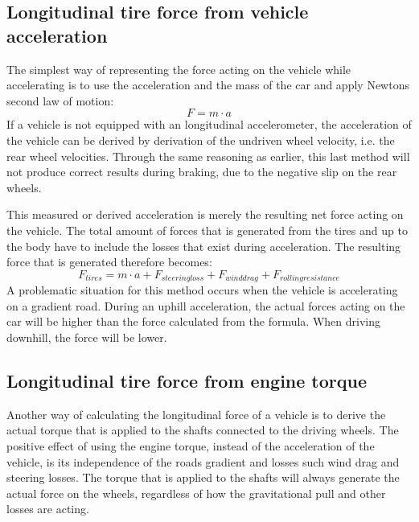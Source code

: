 \subsection{Longitudinal tire force from vehicle acceleration}

The simplest way of representing the force acting on the vehicle while accelerating is to use the acceleration and the mass of the car and apply Newtons second law of motion:
\begin{equation}
	F = m \cdot a
\end{equation}
If a vehicle is not equipped with an longitudinal accelerometer, the acceleration of the vehicle can be derived by derivation of the undriven wheel velocity, i.e. the rear wheel velocities. Through the same reasoning as earlier, this last method will not produce correct results during braking, due to the negative slip on the rear wheels. 

This measured or derived acceleration is merely the resulting net force acting on the vehicle. The total amount of forces that is generated from the tires and up to the body have to include the losses that exist during acceleration. The resulting force that is generated therefore becomes: 
\begin{equation}
F_{tires} = m \cdot a + F_{steering loss} + F_{wind drag} + F_{rolling resistance}
\end{equation}
A problematic situation for this method occurs when the vehicle is accelerating on a gradient road. During an uphill acceleration, the actual forces acting on the car will be higher than the force calculated from the formula. When driving downhill, the force will be lower. 

\subsection{Longitudinal tire force from engine torque}

Another way of calculating the longitudinal force of a vehicle is to derive the actual torque that is applied to the shafts connected to the driving wheels. The positive effect of using the engine torque, instead of the acceleration of the vehicle, is its independence of the roads gradient and losses such wind drag and steering losses. The torque that is applied to the shafts will always generate the actual force on the wheels, regardless of how the gravitational pull and other losses are acting. 

